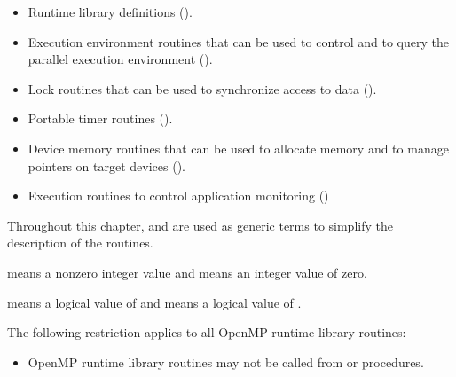 \begin{itemize}
\item Runtime library definitions 
      ().
\item Execution environment routines that can be used to control 
      and to query the parallel execution environment
      ().
\item Lock routines that can be used to synchronize access to 
      data ().
\item Portable timer routines
      ().
\item Device memory routines that can be used to allocate memory 
      and to manage pointers on target devices 
      ().
\item Execution routines to control application monitoring
      ()
\end{itemize}

Throughout this chapter,  and  are used as 
generic terms to simplify the description of the routines.

\begin{samepage}
\begin{ccppspecific}
 means a nonzero integer value and  means 
an integer value of zero.
\end{ccppspecific}
\end{samepage}
\bigskip

\begin{samepage}
\begin{fortranspecific}
 means a logical value of  and  
means a logical value of .
\end{fortranspecific}
\end{samepage}
\bigskip

\begin{samepage}

\begin{fortranspecific}

\restrictions
The following restriction applies to all OpenMP runtime library routines:

\begin{itemize}
\item OpenMP runtime library routines may not be called 
      from  or  procedures.
\end{itemize}
\end{fortranspecific}
\end{samepage}











